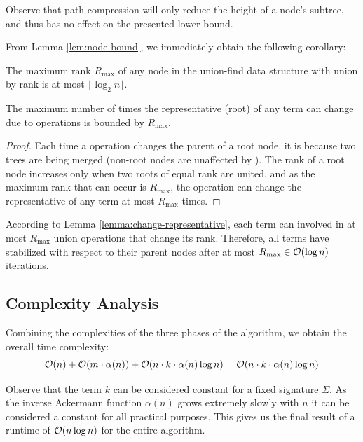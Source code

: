 Observe that path compression will only reduce the height of a node's subtree,
and thus has no effect on the presented lower bound.

From Lemma \ref{lem:node-bound}, we immediately obtain the following corollary:

\begin{corollary}
The maximum rank $R_{\max}$ of any node in the union-find data structure with
union by rank is at most $\lfloor \log_2 n \rfloor$.
\end{corollary}

\begin{lemma}
\label{lemma:change-representative}
The maximum number of times the representative (root) of any term can change due
to \union{} operations is bounded by $R_{\max}$.
\end{lemma}

\begin{proof}
  Each time a \union{} operation changes the parent of a root node, it is because two
  trees are being merged (non-root nodes are unaffected by \union{}). The rank of a root
  node increases only when two roots of equal rank are united, and as the maximum
  rank that can occur is $R_{\max}$, the \union{} operation can change the representative of
  any term at most $R_{\max}$ times.
\end{proof}

According to Lemma \ref{lemma:change-representative}, each term can
involved in at most $R_{\max}$ union operations that change its rank. Therefore,
all terms have stabilized with respect to their parent nodes after at most
$R_{\max} \in \mathcal{O}(\log n)$ iterations.


\subsection{Complexity Analysis}

Combining the complexities of the three phases of the algorithm, we obtain
the overall time complexity:
\[ \mathcal{O}(n) + \mathcal{O}(m \cdot \alpha(n)) + \mathcal{O}(n \cdot k \cdot \alpha(n) \log n) = \mathcal{O}(n \cdot k \cdot \alpha(n) \log n) \]

Observe that the term $k$ can be considered constant for a fixed signature $\Sigma$. As the
inverse Ackermann function $\alpha(n)$ grows extremely slowly with $n$ it can be considered
a constant for all practical purposes. This gives us the final result of a runtime of $\mathcal{O}(n \log n)$
for the entire algorithm.
